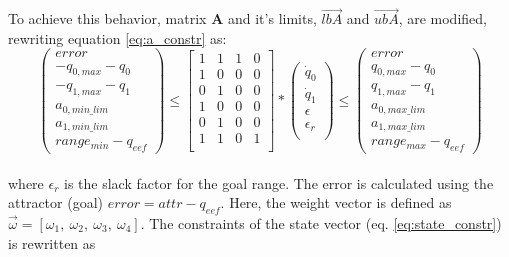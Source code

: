 To achieve this behavior, matrix $\textbf{A}$ and it's limits, $\vec{lbA}$ and $\vec{ubA}$, are modified, rewriting equation \ref{eq:a_constr} as:
$$
\left( \begin{array}{c}
error \\
-q_{0,max} - q_{0} \\
-q_{1,max} - q_{1} \\
a_{0,min\_lim} \\
a_{1,min\_lim} \\
range_{min} - q_{eef}
\end{array}
\right)	\leq 
\left[ \begin{array}{cccc}
1 & 1 & 1 & 0 \\
1 & 0 & 0 & 0 \\
0 & 1 & 0 & 0 \\
1 & 0 & 0 & 0 \\
0 & 1 & 0 & 0 \\
1 & 1 & 0 & 1 \\
\end{array}
\right] *
\left( \begin{array}{c}
\dot{q}_{0} \\
\dot{q}_{1} \\
\epsilon \\
\epsilon_r \\
\end{array}
\right) 
\leq \left( \begin{array}{c}
error \\
q_{0,max} - q_{0} \\
q_{1,max} - q_{1} \\
a_{0,max\_lim} \\
a_{1,max\_lim} \\
range_{max} - q_{eef}
\end{array}
\right)
$$
\\
where $\epsilon_r$ is the slack factor for the goal range. The error is calculated using the attractor (goal) $error = attr - q_{eef}$. Here, the weight vector is defined as $\vec{\omega} = [ \omega_{1},\ \omega_{2},\ \omega_{3},\ \omega_{4} ]$. The constraints of the state vector (eq. \ref{eq:state_constr}) is rewritten as

